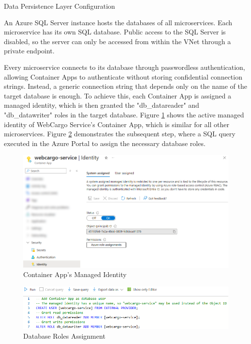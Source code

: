 \documentclass[12pt, reqno]{amsbook}
\makeatletter
\def\subsection{\@startsection{subsection}{2}%
      \z@{.5\linespacing\@plus.7\linespacing}{.25\linespacing}%
      {\normalfont\bfseries\flushleft}}
\theoremstyle{definition}
\theoremstyle{definition}
\numberwithin{section}{chapter}
\numberwithin{table}{chapter}
\numberwithin{figure}{chapter}
\makeatother
\begin{document}
\subsection{Data Persistence Layer Configuration}

An Azure SQL Server instance hosts the databases of all microservices. Each microservice has its own SQL database. Public access to the SQL Server is disabled, so the server can only be accessed from within the \ac{VNet} through a private endpoint.

Every microservice connects to its database through passwordless authentication, allowing Container Apps to authenticate without storing confidential connection strings. Instead, a generic connection string that depends only on the name of the target database is enough. To achieve this, each Container App is assigned a managed identity, which is then granted the "db\_datareader" and "db\_datawriter" roles in the target database. Figure \ref{Figure:DatabaseConfigurationManagedIdentity} shows the active managed identity of WebCargo Service's Container App, which is similar for all other microservices.
Figure \ref{Figure:DatabaseConfigurationQuery} demonstrates the subsequent step, where a \ac{SQL} query executed in the Azure Portal to assign the necessary database roles.

\begin{figure}[H]
  \centering
  \includegraphics[width=0.9\linewidth]{images/DatabaseConfigurationManagedIdentity.png}
  \caption{\label{Figure:DatabaseConfigurationManagedIdentity}Container App's Managed Identity}
\end{figure}

\begin{figure}[H]
  \centering
  \includegraphics[width=1\linewidth]{images/DatabaseConfigurationQuery.png}
  \caption{\label{Figure:DatabaseConfigurationQuery}Database Roles Assignment}
\end{figure}
\end{document}
